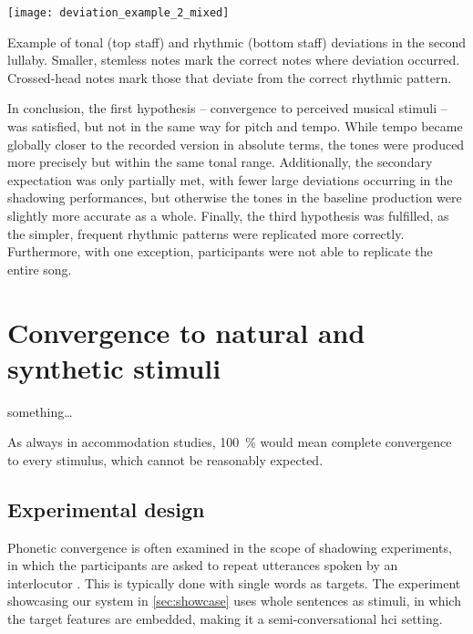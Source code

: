 \begin{snippet}[t]
	\centering
	\texttt{[image: deviation\_example\_2\_mixed]}
	\caption{Example of tonal (top staff) and rhythmic (bottom staff) deviations in the second lullaby.
			Smaller, stemless notes mark the correct notes where deviation occurred.
			Crossed-head notes mark those that deviate from the correct rhythmic pattern.}
	\label{snippet:deviation_example}
\end{snippet}


In conclusion, the first hypothesis -- convergence to perceived musical stimuli -- was satisfied, but not in the same way for pitch and tempo.
While tempo became globally closer to the recorded version in absolute terms, the tones were produced more precisely but within the same tonal range.
Additionally, the secondary expectation was only partially met, with fewer large deviations occurring in the shadowing performances, but otherwise the tones in the baseline production were slightly more accurate as a whole.
Finally, the third hypothesis was fulfilled, as the simpler, frequent rhythmic patterns were replicated more correctly.
Furthermore, with one exception, participants were not able to replicate the entire song.

\section{Convergence to natural and synthetic stimuli}
\label{sec:convergence_to_natural_and_synthetic_stimuli}

something\ldots

As always in accommodation studies, \SI{100}{\percent} would mean complete convergence to every stimulus, which cannot be reasonably expected.

\subsection{Experimental design}
\label{subsec:design_HCIConv}

Phonetic convergence is often examined in the scope of shadowing experiments, in which the participants are asked to repeat utterances spoken by an interlocutor \citep[e.g.,][]{Pardo2017phonetic, Dias2016visibilivty, Walker2015repeat, Shockley2004imitation}.
This is typically done with single words as targets.
The experiment showcasing our system in \cref{sec:showcase} uses whole sentences as stimuli, in which the target features are embedded, making it a semi-conversational \ac{hci} setting.

